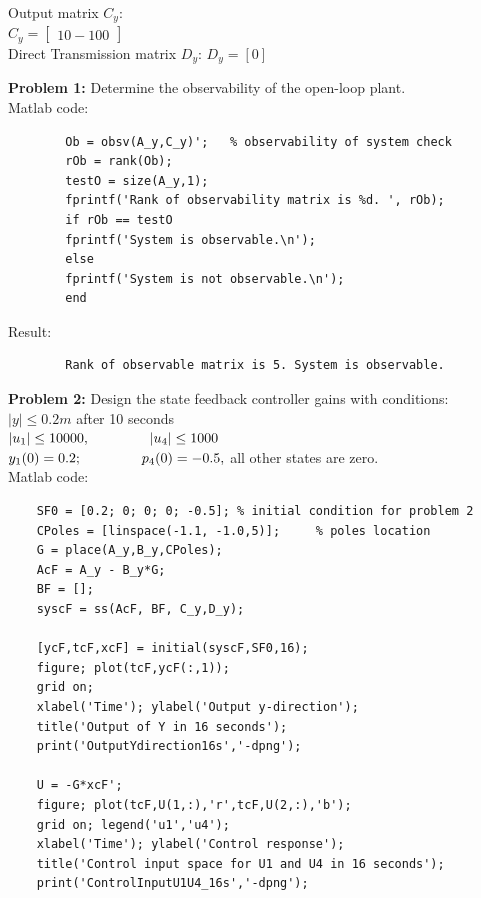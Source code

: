 \documentclass[14pt,a4paper]{article}
\begin{document}
	Output matrix $C_y$: \\
	\hspace*{2.5cm}$ C_y = \begin{bmatrix} 1 0 -1 0 0 \end{bmatrix} $ \\
	
	Direct Transmission matrix $D_y$: $D_y = [0]$ \\
	
\pagebreak

\large\textbf{Problem 1:} Determine the observability of the open-loop plant.\\
	Matlab code:
	\begin{lstlisting}
		Ob = obsv(A_y,C_y)';   % observability of system check
		rOb = rank(Ob);
		testO = size(A_y,1);
		fprintf('Rank of observability matrix is %d. ', rOb);
		if rOb == testO
		fprintf('System is observable.\n');
		else
		fprintf('System is not observable.\n');
		end
	\end{lstlisting}
	Result:
	\begin{lstlisting}
		Rank of observable matrix is 5. System is observable.
	\end{lstlisting}

\vspace{1cm}
\large\textbf{Problem 2:} Design the state feedback controller gains with conditions: \\
\hspace*{2cm} $ |y| \leq 0.2 m $ after 10 seconds \\
\hspace*{2cm} $ |u_1| \leq 10000, \hspace{1.5cm} |u_4| \leq 1000 $\\
\hspace*{2cm} $ y_1(0) = 0.2; \hspace{1.5cm} p_4(0) = -0.5 , $ \hspace{1.5cm} all other states are zero.\\
	Matlab code:
	\begin{lstlisting}
	SF0 = [0.2; 0; 0; 0; -0.5]; % initial condition for problem 2
	CPoles = [linspace(-1.1, -1.0,5)];     % poles location
	G = place(A_y,B_y,CPoles);
	AcF = A_y - B_y*G;
	BF = [];
	syscF = ss(AcF, BF, C_y,D_y);
	
	[ycF,tcF,xcF] = initial(syscF,SF0,16);
	figure;	plot(tcF,ycF(:,1));
	grid on; 
	xlabel('Time'); ylabel('Output y-direction');
	title('Output of Y in 16 seconds');
	print('OutputYdirection16s','-dpng');
	
	U = -G*xcF';
	figure;	plot(tcF,U(1,:),'r',tcF,U(2,:),'b');
	grid on; legend('u1','u4');  
	xlabel('Time'); ylabel('Control response');
	title('Control input space for U1 and U4 in 16 seconds');
	print('ControlInputU1U4_16s','-dpng');
	\end{lstlisting} 
	
\end{document}
